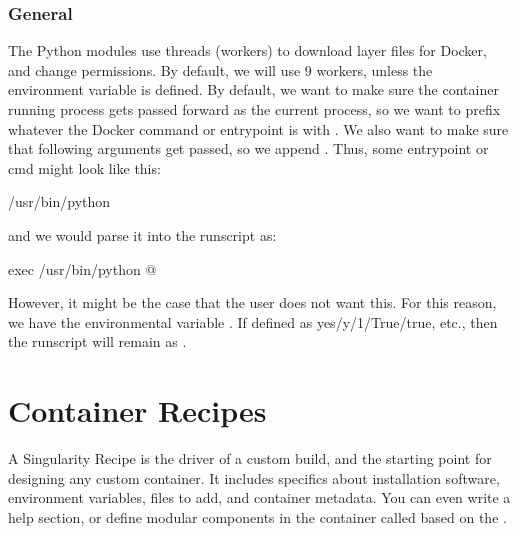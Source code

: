 \documentclass[letterpaper,10pt,english]{sphinxmanual}
\begin{document}
\subsection{General}
\label{\detokenize{build_environment:general}}
 The Python modules use threads (workers) to
download layer files for Docker, and change permissions. By default,
we will use 9 workers, unless the environment variable  is defined.
 By default, we want to make sure the
container running process gets passed forward as the current process,
so we want to prefix whatever the Docker command or entrypoint is with
. We also want to make sure that following arguments get passed, so we
append . Thus, some entrypoint or cmd might look like this:

%
\begin{sphinxVerbatim}[commandchars=\\\{\}]
/usr/bin/python
\end{sphinxVerbatim}

and we would parse it into the runscript as:

%
\begin{sphinxVerbatim}[commandchars=\\\{\}]
exec /usr/bin/python \PYGZdq{}\PYGZdl{}@\PYGZdq{}
\end{sphinxVerbatim}

However, it might be the case that the user does not want this. For this
reason, we have the environmental variable . If defined as
yes/y/1/True/true, etc., then the runscript will remain as .


\chapter{Container Recipes}
\label{\detokenize{container_recipes:container-recipes}}\label{\detokenize{container_recipes:id1}}\label{\detokenize{container_recipes::doc}}\label{\detokenize{container_recipes:sec-recipefile}}
A Singularity Recipe is the driver of a custom build, and the starting
point for designing any custom container. It includes specifics about
installation software, environment variables, files to add, and
container metadata. You can even write a help section, or define modular
components in the container called based on the .
\end{document}
